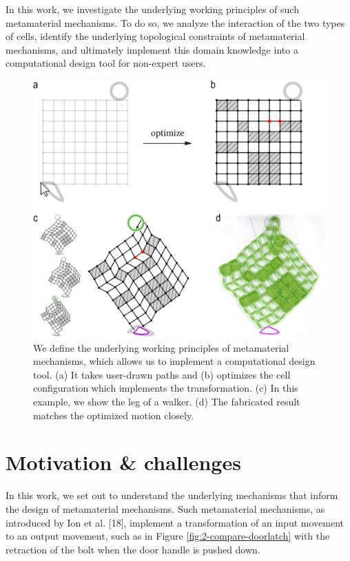 In this work, we investigate the underlying working principles of such metamaterial mechanisms. To do so, we analyze the interaction of the two types of cells, identify the underlying topological constraints of metamaterial mechanisms, and ultimately implement this domain knowledge into a computational design tool for non-expert users.

\begin{figure} [h]
    \includegraphics[width=\textwidth]{chapters/understanding-metamaterial-mechanisms-FIG/1-editor-and-walker.png}
    \caption[Short figure name.]{We define the underlying working principles of metamaterial mechanisms, which allows us to implement a computational design tool. (a) It takes user-drawn paths and (b) optimizes the cell configuration which implements the transformation. (c) In this example, we show the leg of a walker. (d) The fabricated result matches the optimized motion closely.
    \label{fig:1-editor-walker}}
\end{figure}


\section{Motivation \& challenges}

In this work, we set out to understand the underlying mechanisms that inform the design of metamaterial mechanisms. Such metamaterial mechanisms, as introduced by Ion et al. [18], implement a transformation of an input movement to an output movement, such as in Figure \ref{fig:2-compare-doorlatch} with the retraction of the bolt when the door handle is pushed down.

